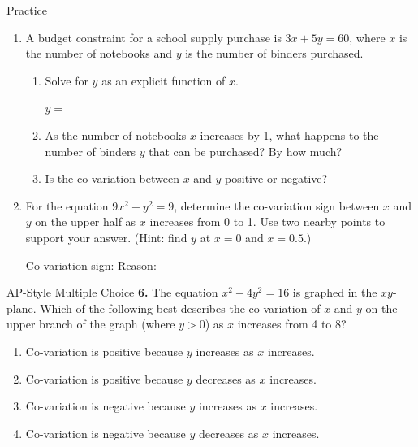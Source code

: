 \documentclass[10pt]{article}
\begin{document}
\begin{notesbox}{Practice}
\begin{enumerate}[leftmargin=1.5em, itemsep=10pt]
\begin{enumerate}[leftmargin=1.2em, itemsep=6pt]
    \vspace{0.2in}
\end{enumerate}

\item A budget constraint for a school supply purchase is $3x + 5y = 60$, where $x$ is the
      number of notebooks and $y$ is the number of binders purchased.
\begin{enumerate}[leftmargin=1.2em, itemsep=6pt]
    \item[(a)] Solve for $y$ as an explicit function of $x$.

    \vspace{0.4in}
    $y = $ \blank{5cm}

    \item[(b)] As the number of notebooks $x$ increases by 1, what happens to the number of
               binders $y$ that can be purchased? By how much?

    \vspace{0.35in}
    \writeline

    \item[(c)] Is the co-variation between $x$ and $y$ positive or negative? \blank{4cm}
\end{enumerate}

\item For the equation $9x^2 + y^2 = 9$, determine the co-variation sign between $x$ and $y$
      on the upper half as $x$ increases from 0 to 1. Use two nearby points to support your
      answer. (Hint: find $y$ at $x = 0$ and $x = 0.5$.)

\vspace{0.7in}
Co-variation sign: \blank{3cm} \quad Reason: \blank{6cm}

\end{enumerate}
\end{notesbox}

\vspace{0.08in}

\begin{notesbox}{AP-Style Multiple Choice}
\textbf{6.} The equation $x^2 - 4y^2 = 16$ is graphed in the $xy$-plane. Which of the
following best describes the co-variation of $x$ and $y$ on the upper branch of the graph
(where $y > 0$) as $x$ increases from 4 to 8?

\vspace{6pt}
\begin{enumerate}[label=(\Alph*), leftmargin=2em, itemsep=4pt]
    \item Co-variation is positive because $y$ increases as $x$ increases.
    \item Co-variation is positive because $y$ decreases as $x$ increases.
    \item Co-variation is negative because $y$ increases as $x$ increases.
    \item Co-variation is negative because $y$ decreases as $x$ increases.
\end{enumerate}
\end{notesbox}
\end{document}
